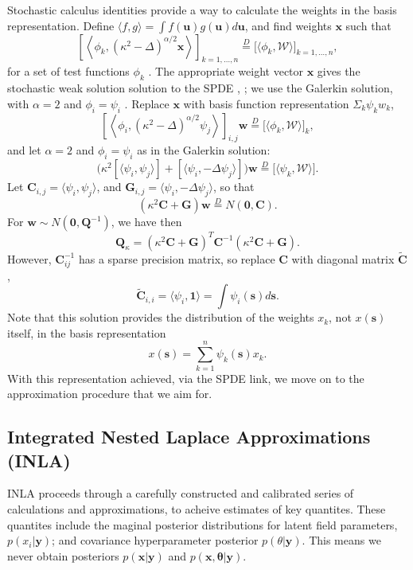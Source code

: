 Stochastic calculus identities provide a way to calculate the weights in the basis representation. Define $\langle f, g \rangle = \int f(\pmb{u}) g(\pmb{u}) d\pmb{u}$, and find weights $\pmb{x}$ such that
$$ \left[ \left< \phi_{k}, (\kappa^{2} - \Delta)^{\alpha/2} \pmb{x} \right> \right]_{k = 1, \hdots, n} \overset{D}{=} \Big[ \langle \phi_{k}, \mathcal{W} \rangle \Big]_{k = 1, \hdots, n},$$
for a set of test functions $\phi_{k}$ \citep{Lindgren2011}. The appropriate weight vector $\pmb{x}$ gives the stochastic weak solution solution to the SPDE \citep{Mao2007}, \cite{Lindstrom2014}; we use the Galerkin solution, with $\alpha = 2$ and $\phi_{i} = \psi_{i}$ \citep{Lindgren2011}. Replace $\pmb{x}$ with basis function representation $\Sigma_{k}\psi_{k}w_{k}$,
$$ \left[ \left< \phi_{i}, (\kappa^{2} - \Delta)^{\alpha/2} \psi_{j} \right> \right]_{i,j}\pmb{w} \overset{D}{=} \Big[ \langle \phi_{k}, \mathcal{W} \rangle \Big]_{k}, $$
and let $\alpha = 2$ and $\phi_{i} = \psi_{i}$ as in the Galerkin solution:
$$ \Big(
\kappa^{2} [ \langle \psi_{i}, \psi_{j} \rangle ] + [ \langle \psi_{i}, -\Delta \psi_{j} \rangle ]
\Big) \pmb{w} \overset{D}{=} \Big[ \langle \psi_{k}, \mathcal{W} \rangle \Big]. $$
Let $\pmb{C}_{i,j} = \langle \psi_{i}, \psi_{j} \rangle$, and $ \pmb{G}_{i,j} = \langle \psi_{i}, - \Delta \psi_{j} \rangle$, so that
$$ \left(
\kappa^{2} \pmb{C} + \pmb{G} \right) \pmb{w} \overset{D}{=} N(\pmb{0},\pmb{C}).$$
For $\pmb{w} \sim N(\pmb{0}, \pmb{Q}^{-1})$, we have then
$$\pmb{Q}_{\kappa} = \left( \kappa^{2} \pmb{C} + \pmb{G} \right)^{T} \pmb{C}^{-1} \left( \kappa^{2} \pmb{C} + \pmb{G} \right).$$ 
However, $\pmb{C}_{ij}^{-1}$ has a sparse precision matrix, so replace $\pmb{C}$ with diagonal matrix $\widetilde{\pmb{C}}$,
$$ \widetilde{\pmb{C}}_{i,i} = \langle \psi_{i}, \pmb{1} \rangle = \int \psi_{i}(\pmb{s}) d\pmb{s}.$$ 
Note that this solution provides the distribution of the weights $x_{k}$, not $x(\pmb{s})$ itself, in the basis representation
$$ x(\pmb{s}) = \sum_{k=1}^{n} \psi_{k}(\pmb{s})x_{k}.$$
With this representation achieved, via the SPDE link, we move on to the approximation procedure that we aim for.

\subsection{Integrated Nested Laplace Approximations (INLA)}

INLA proceeds through a carefully constructed and calibrated series of calculations and approximations, to acheive estimates of key quantites. These quantites include the maginal posterior distributions for latent field parameters, $p(x_{i}|\pmb{y})$; and covariance hyperparameter posterior $p(\theta|\pmb{y})$. This means we never obtain posteriors $p(\pmb{x}|\pmb{y})$ and $p(\pmb{x},\pmb{\theta}|\pmb{y})$. 

